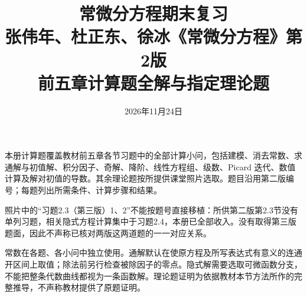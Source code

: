 \documentclass[UTF8,a4paper,11pt,fontset=windows]{ctexart}
\title{常微分方程期末复习\\\large 张伟年、杜正东、徐冰《常微分方程》第2版\\前五章计算题全解与指定理论题}
\author{}\date{2026年11月24日}
\begin{document}
\maketitle
本册计算题覆盖教材前五章各节习题中的全部计算小问，包括建模、消去常数、求通解与初值解、积分因子、奇解、降阶、线性方程组、级数、Picard 迭代、数值计算及解对初值的导数。其余理论题按所提供课堂照片选取。题目沿用第二版编号；每题列出所需条件、计算步骤和结果。

照片中的“习题2.3（第三版）1、2”不能按题号直接移植：所供第二版第2.3节没有单列习题，相关隐式方程计算集中于习题2.4，本册已全部收入。没有取得第三版题面，因此不声称已核对两版这两道题的一一对应关系。

常数在各题、各小问中独立使用。通解默认在使原方程及所写表达式有意义的连通开区间上取值；除法前另行检查被除因子的零点。隐式解需要选取可微函数分支，不能把整条代数曲线都视为一条函数解。理论题证明为依据教材本节方法所作的完整推导，不声称教材提供了原题证明。
\tableofcontents\clearpage

\clearpage
\clearpage
\clearpage
\clearpage
\clearpage
\clearpage
\end{document}
